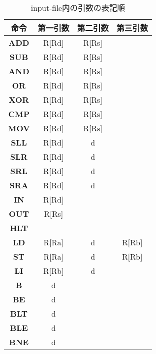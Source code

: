 \documentclass[11pt,a4j]{jarticle}%
\begin{document}
\begin{table}[htbp]
\centering
\caption{input-file内の引数の表記順}
\begin{tabular}{|c|c|c|c|}
\hline
\textbf{命令}  & \textbf{第一引数} & \textbf{第二引数} & \textbf{第三引数} \\ \hline
\textbf{ADD} & R{[}Rd{]}     & R{[}Rs{]}     &               \\ \hline
\textbf{SUB} & R{[}Rd{]}     & R{[}Rs{]}     &               \\ \hline
\textbf{AND} & R{[}Rd{]}     & R{[}Rs{]}     &               \\ \hline
\textbf{OR}  & R{[}Rd{]}     & R{[}Rs{]}     &               \\ \hline
\textbf{XOR} & R{[}Rd{]}     & R{[}Rs{]}     &               \\ \hline
\textbf{CMP} & R{[}Rd{]}     & R{[}Rs{]}     &               \\ \hline
\textbf{MOV} & R{[}Rd{]}     & R{[}Rs{]}     &               \\ \hline
\textbf{SLL} & R{[}Rd{]}     & d             &               \\ \hline
\textbf{SLR} & R{[}Rd{]}     & d             &               \\ \hline
\textbf{SRL} & R{[}Rd{]}     & d             &               \\ \hline
\textbf{SRA} & R{[}Rd{]}     & d             &               \\ \hline
\textbf{IN}  & R{[}Rd{]}     &               &               \\ \hline
\textbf{OUT} & R{[}Rs{]}     &               &               \\ \hline
\textbf{HLT} &            &               &               \\ \hline
\textbf{LD}  & R{[}Ra{]}     & d             & R{[}Rb{]}     \\ \hline
\textbf{ST}  & R{[}Ra{]}     & d             & R{[}Rb{]}     \\ \hline
\textbf{LI}  & R{[}Rb{]}     & d             &               \\ \hline
\textbf{B}   & d             &               &               \\ \hline
\textbf{BE}  & d             &               &               \\ \hline
\textbf{BLT} & d             &               &               \\ \hline
\textbf{BLE} & d             &               &               \\ \hline
\textbf{BNE} & d             &               &               \\ \hline
\end{tabular}
\end{table}
\end{document}
